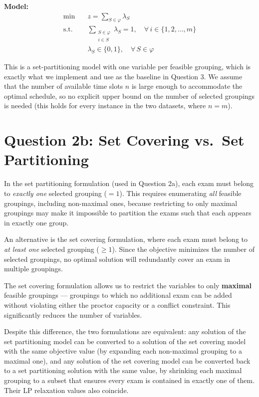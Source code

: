 \documentclass{article}
\begin{document}
\textbf{Model:}
\begin{align}
\min \quad & z = \sum_{S \in \varphi} \lambda_S \\
\text{s.t.} \quad & \sum_{\substack{S \in \varphi \\ i \in S}} \lambda_S = 1, \quad \forall\, i \in \{1, 2, \dots, m\} \\
& \lambda_S \in \{0,1\}, \quad \forall\, S \in \varphi
\end{align}

This is a set-partitioning model with one variable per feasible grouping, which is
exactly what we implement and use as the baseline in Question 3. We assume that the
number of available time slots $n$ is large enough to accommodate the optimal
schedule, so no explicit upper bound on the number of selected groupings is needed
(this holds for every instance in the two datasets, where $n = m$).

\section{Question 2b: Set Covering vs.\ Set Partitioning}

In the set partitioning formulation (used in Question 2a), each exam must belong to
\emph{exactly one} selected grouping ($= 1$). This requires enumerating \emph{all}
feasible groupings, including non-maximal ones, because restricting to only maximal
groupings may make it impossible to partition the exams such that each appears in
exactly one group.

An alternative is the set covering formulation, where each exam must belong to
\emph{at least one} selected grouping ($\geq 1$). Since the objective minimizes the
number of selected groupings, no optimal solution will redundantly cover an exam
in multiple groupings.

The set covering formulation allows us to restrict the variables to only
\textbf{maximal} feasible groupings --- groupings to which no additional exam can be
added without violating either the proctor capacity or a conflict constraint. This
significantly reduces the number of variables.

Despite this difference, the two formulations are equivalent: any solution of the
set partitioning model can be converted to a solution of the set covering model with
the same objective value (by expanding each non-maximal grouping to a maximal one),
and any solution of the set covering model can be converted back to a set
partitioning solution with the same value, by shrinking each maximal grouping to a
subset that ensures every exam is contained in exactly one of them. Their LP
relaxation values also coincide.
\end{document}

